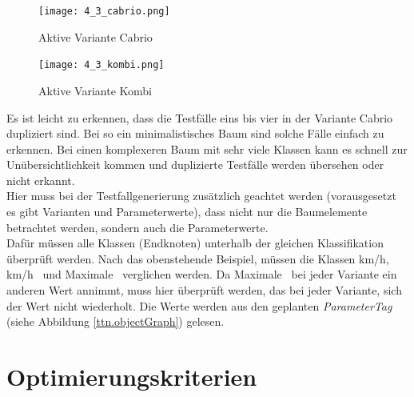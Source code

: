 \begin{figure}[h!]
  \begin{center}
    \texttt{[image: 4\_3\_cabrio.png]}
  		  \caption{Aktive Variante Cabrio}
     \label{ttn.cases_cabrio}
  \end{center}
\end{figure}

\begin{figure}[h!]
  \begin{center}
    \texttt{[image: 4\_3\_kombi.png]}
  		  \caption{Aktive Variante Kombi}
     \label{ttn.cases_kombi}
  \end{center}
\end{figure}

Es ist leicht zu erkennen, dass die Testfälle eins bis vier in der Variante \glqq Cabrio\grqq~ dupliziert sind. Bei so ein minimalistisches Baum sind solche Fälle einfach zu erkennen. Bei einen komplexeren Baum mit sehr viele Klassen kann es schnell zur Unübersichtlichkeit kommen und duplizierte Testfälle werden übersehen oder nicht erkannt.\\

Hier muss bei der Testfallgenerierung zusätzlich geachtet werden (vorausgesetzt es gibt Varianten und Parameterwerte), dass nicht nur die Baumelemente betrachtet werden, sondern auch die Parameterwerte.\\

Dafür müssen alle Klassen (Endknoten) unterhalb der gleichen Klassifikation überprüft werden. Nach das obenstehende Beispiel, müssen die Klassen  km/h\grqq ,  km/h\grqq~ und \glqq Maximale\grqq~ verglichen werden. Da \glqq Maximale\grqq~ bei jeder Variante ein anderen Wert annimmt, muss hier überprüft werden, das bei jeder Variante, sich der Wert nicht wiederholt. Die Werte werden aus den geplanten \textit{ParameterTag} (siehe Abbildung \ref{ttn.objectGraph}) gelesen.

\newpage
\section{Optimierungskriterien}
\paragraph{}

